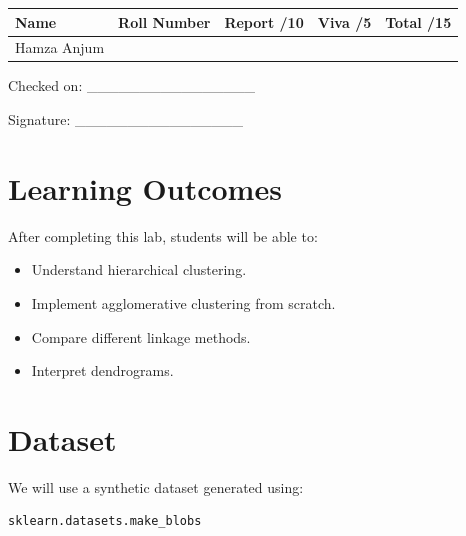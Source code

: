 \documentclass[12pt,a4paper]{article}
\begin{document}
\renewcommand{\arraystretch}{2.0}
\begin{tabularx}{\textwidth}{|Y|Y|Y|Y|Y|}
\hline
\textbf{Name} & \textbf{Roll Number} & \textbf{Report /10} & \textbf{Viva /5} & \textbf{Total /15} \\
\hline
Hamza Anjum & & & & \\
\hline
\end{tabularx}
\renewcommand{\arraystretch}{1.0}

\vspace{12pt}

\begin{flushright}
Checked on: \_\_\_\_\_\_\_\_\_\_\_\_\_\_\_\_

\vspace{6pt}

Signature: \_\_\_\_\_\_\_\_\_\_\_\_\_\_\_\_
\end{flushright}

\newpage


\section{Learning Outcomes}

After completing this lab, students will be able to:

\begin{itemize}
\item Understand hierarchical clustering.
\item Implement agglomerative clustering from scratch.
\item Compare different linkage methods.
\item Interpret dendrograms.
\end{itemize}


\section{Dataset}

We will use a synthetic dataset generated using:

\begin{lstlisting}
sklearn.datasets.make_blobs
\end{lstlisting}
\end{document}
